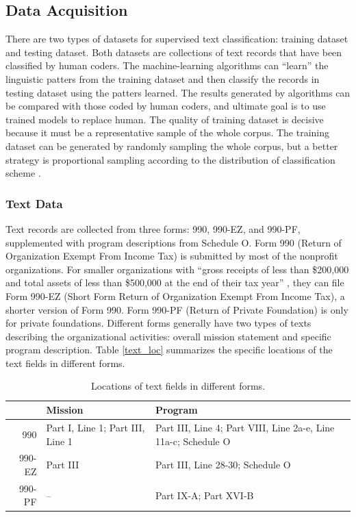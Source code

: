 \documentclass[12pt]{article}
\begin{document}
\subsection{Data Acquisition}

There are two types of datasets for supervised text classification: training dataset and testing dataset. Both datasets are collections of text records that have been classified by human coders. The machine-learning algorithms can ``learn'' the linguistic patters from the training dataset and then classify the records in testing dataset using the patters learned. The results generated by algorithms can be compared with those coded by human coders, and ultimate goal is to use trained models to replace human. The quality of training dataset is decisive because it must be a representative sample of the whole corpus. The training dataset can be generated by randomly sampling the whole corpus, but a better strategy is proportional sampling according to the distribution of classification scheme \parencite[278]{GrimmerTextDataPromise2013}.

\subsubsection{Text Data}

Text records are collected from three forms: 990, 990-EZ, and 990-PF, supplemented with program descriptions from Schedule O. Form 990 (Return of Organization Exempt From Income Tax) is submitted by most of the nonprofit organizations. For smaller organizations with ``gross receipts of less than \$200,000 and total assets of less than \$500,000 at the end of their tax year'' \parencite[1]{USInternalRevenueService2017InstructionsForm2018}, they can file Form 990-EZ (Short Form Return of Organization Exempt From Income Tax), a shorter version of Form 990. Form 990-PF (Return of Private Foundation) is only for private foundations. Different forms generally have two types of texts describing the organizational activities: overall mission statement and specific program description. Table \ref{text_loc} summarizes the specific locations of the text fields in different forms.

\begin{table}[]
    \centering
    \begin{tabularx}{\textwidth}{r|X|X}
         & Mission & Program \\
         \hline
         990 & Part I, Line 1; Part III, Line 1 & Part III, Line 4; Part VIII, Line 2a-e, Line 11a-c; Schedule O \\
         990-EZ & Part III & Part III, Line 28-30; Schedule O \\
         990-PF & -- & Part IX-A; Part XVI-B \\
    \end{tabularx}
    \caption{Locations of text fields in different forms.} \label{text_loc}
    \label{tab:my_label}
\end{table}
\end{document}
